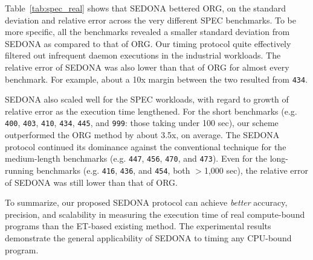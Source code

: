 \documentclass[letter]{ieice}
\begin{document}
Table~\ref{tab:spec_real} shows that 
SEDONA bettered ORG,
on the standard deviation and relative error across the very different SPEC benchmarks. 
To be more specific, all the benchmarks revealed a smaller standard deviation 
from SEDONA as compared to that of ORG. 
Our timing protocol quite effectively filtered out infrequent daemon executions 
in the industrial workloads. The relative error of SEDONA was also 
lower than that of ORG for almost every benchmark.
For example, about a 10x \hbox{margin} between the two resulted from {\tt 434}.

SEDONA also scaled well for the SPEC workloads, 
with regard to growth of relative error as the execution time lengthened.
For the short benchmarks 
(e.g. {\tt 400}, {\tt 403}, {\tt 410}, 
{\tt 434}, {\tt 445}, and {\tt 999}: those taking \hbox{under} 100 sec), 
our scheme outperformed the ORG method by about 3.5x, on average. 
The SEDONA protocol continued its dominance against the conventional technique 
for the medium-length benchmarks (e.g. {\tt 447}, {\tt 456}, {\tt 470}, and {\tt 473}).
Even for the long-running benchmarks (e.g. {\tt 416}, {\tt 436}, and {\tt 454}, both $>$1,000 sec), 
the relative error of \hbox{SEDONA} was still lower than that of ORG.

To summarize, our proposed SEDONA protocol can achieve {\em better} accuracy,
precision, and scalability in measuring the execution time of real \hbox{compute-bound} programs 
than the ET-based existing method. 
The experimental results demonstrate 
the general applicability of SEDONA to timing any CPU-bound program.
\end{document}
